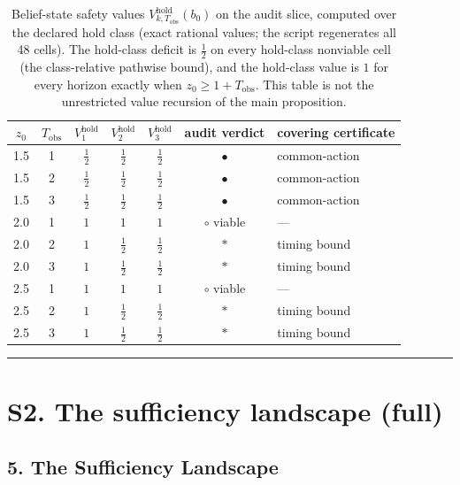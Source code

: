 \documentclass[11pt]{article}
\theoremstyle{definition}
\begin{document}
\begin{table}[t]
\centering
\footnotesize
\begin{tabular}{@{}ccccccl@{}}
\toprule
\(z_{0}\) & \(T_{\mathrm{obs}}\) & \(V^{\mathrm{hold}}_{1}\) & \(V^{\mathrm{hold}}_{2}\) & \(V^{\mathrm{hold}}_{3}\) & audit verdict & covering certificate \\
\midrule
1.5 & 1 & \(\tfrac{1}{2}\) & \(\tfrac{1}{2}\) & \(\tfrac{1}{2}\) & \(\bullet\) & common-action \\
1.5 & 2 & \(\tfrac{1}{2}\) & \(\tfrac{1}{2}\) & \(\tfrac{1}{2}\) & \(\bullet\) & common-action \\
1.5 & 3 & \(\tfrac{1}{2}\) & \(\tfrac{1}{2}\) & \(\tfrac{1}{2}\) & \(\bullet\) & common-action \\
2.0 & 1 & \(1\) & \(1\) & \(1\) & \(\circ\) viable & --- \\
2.0 & 2 & \(1\) & \(\tfrac{1}{2}\) & \(\tfrac{1}{2}\) & \(\ast\) & timing bound \\
2.0 & 3 & \(1\) & \(\tfrac{1}{2}\) & \(\tfrac{1}{2}\) & \(\ast\) & timing bound \\
2.5 & 1 & \(1\) & \(1\) & \(1\) & \(\circ\) viable & --- \\
2.5 & 2 & \(1\) & \(\tfrac{1}{2}\) & \(\tfrac{1}{2}\) & \(\ast\) & timing bound \\
2.5 & 3 & \(1\) & \(\tfrac{1}{2}\) & \(\tfrac{1}{2}\) & \(\ast\) & timing bound \\
\bottomrule
\end{tabular}
\caption{Belief-state safety values \(V^{\mathrm{hold}}_{k,T_{\mathrm{obs}}}(b_{0})\) on the audit slice,
computed over the declared hold class (exact rational values; the script
regenerates all 48 cells). The hold-class deficit is \(\tfrac{1}{2}\) on every hold-class nonviable
cell (the class-relative pathwise bound), and the hold-class value is
\(1\) for every horizon exactly when \(z_0\ge1+T_{\mathrm{obs}}\).
This table is not the unrestricted value recursion of the main proposition.}
\label{tab:beliefV}
\end{table}
\rule{0.5\linewidth}{0.5pt}

\bigskip

\section*{S2. The sufficiency landscape (full)}

\subsection{5. The Sufficiency Landscape}\label{the-sufficiency-landscape-cited}
\end{document}
